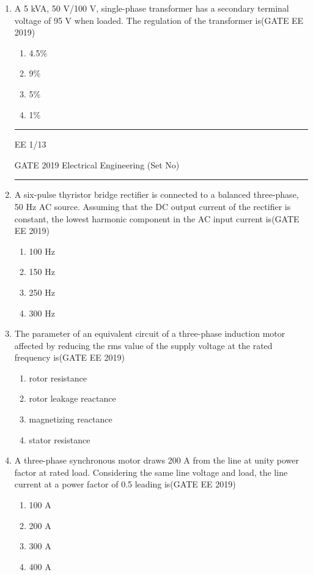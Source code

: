 \documentclass[a4paper,10pt]{exam}
\theoremstyle{remark}
\begin{document}
\begin{enumerate}
\begin{enumerate}[label=\arabic*.]
\item A 5 kVA, 50 V/100 V, single-phase transformer has a secondary terminal voltage of 95 V when loaded. The regulation of the transformer is\hfill{(GATE EE 2019)}
\begin{multicols}{4}
\begin{enumerate}
\item 4.5\%
\item 9\%
\item 5\%
\item 1\%
\end{enumerate}
\end{multicols}
\vfill
\noindent\rule{\linewidth}{0.4pt}
EE \hfill 1/13
\newpage
\raggedright{GATE 2019 Electrical Engineering (Set No)}
\noindent\rule{\linewidth}{0.4pt}

\item A six-pulse thyristor bridge rectifier is connected to a balanced three-phase, 50 Hz AC source. Assuming that the DC output current of the rectifier is constant, the lowest harmonic component in the AC input current is\hfill{(GATE EE 2019)}
\begin{multicols}{4}
\begin{enumerate}
    \item 100 Hz
    \item 150 Hz
    \item 250 Hz
    \item 300 Hz
\end{enumerate}
\end{multicols}

\item The parameter of an equivalent circuit of a three-phase induction motor affected by reducing the rms value of the supply voltage at the rated frequency is\hfill{(GATE EE 2019)}
\begin{enumerate}
    \item rotor resistance
    \item rotor leakage reactance
    \item magnetizing reactance
    \item stator resistance
\end{enumerate}
\item A three-phase synchronous motor draws 200 A from the line at unity power factor at rated load. Considering the same line voltage and load, the line current at a power factor of 0.5 leading is\hfill{(GATE EE 2019)}
\begin{multicols}{4}
\begin{enumerate}
    \item 100 A
    \item 200 A
    \item 300 A
    \item 400 A
\end{enumerate}
\end{multicols}


\end{enumerate}
\end{enumerate}
\end{document}
